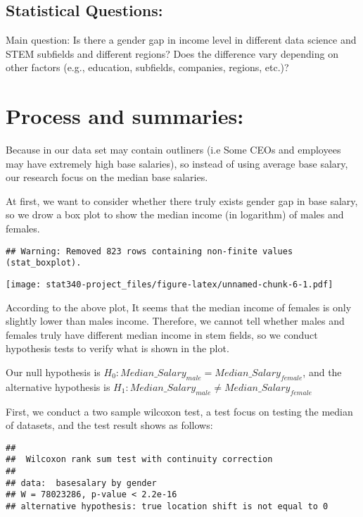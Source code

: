 \documentclass[
]{article}
\begin{document}
\hypertarget{statistical-questions}{%
\subsection{Statistical Questions:}\label{statistical-questions}}

Main question: Is there a gender gap in income level in different data
science and STEM subfields and different regions? Does the difference
vary depending on other factors (e.g., education, subfields, companies,
regions, etc.)?

\hypertarget{process-and-summaries}{%
\section{Process and summaries:}\label{process-and-summaries}}

Because in our data set may contain outliners (i.e Some CEOs and
employees may have extremely high base salaries), so instead of using
average base salary, our research focus on the median base salaries.

At first, we want to consider whether there truly exists gender gap in
base salary, so we drow a box plot to show the median income (in
logarithm) of males and females.

\begin{verbatim}
## Warning: Removed 823 rows containing non-finite values (stat_boxplot).
\end{verbatim}

\texttt{[image: stat340-project\_files/figure-latex/unnamed-chunk-6-1.pdf]}

According to the above plot, It seems that the median income of females
is only slightly lower than males income. Therefore, we cannot tell
whether males and females truly have different median income in stem
fields, so we conduct hypothesis tests to verify what is shown in the
plot.

Our null hypothesis is
\(H_0 : Median\_Salary_{male} = Median\_Salary_{female}\), and the
alternative hypothesis is
\(H_1: Median\_Salary_{male} \neq Median\_Salary_{female}\)

First, we conduct a two sample wilcoxon test, a test focus on testing
the median of datasets, and the test result shows as follows:

\begin{verbatim}
## 
##  Wilcoxon rank sum test with continuity correction
## 
## data:  basesalary by gender
## W = 78023286, p-value < 2.2e-16
## alternative hypothesis: true location shift is not equal to 0
\end{verbatim}
\end{document}
